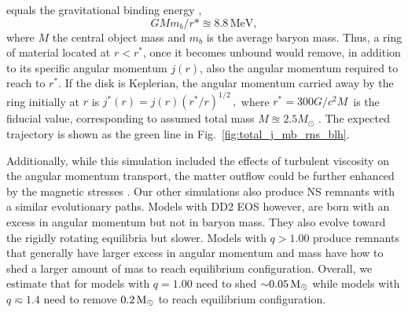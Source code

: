 equals the gravitational binding energy
\citep[\eg][]{Fernandez:2013tya}, 
%
\begin{equation*}
    G M m_b / r* \approxeq 8.8\, \text{MeV}, 
\end{equation*}
%
where $M$ the central object mass and $m_b$ is the average baryon mass.
Thus, a ring of material located at $r < r^*$, once it becomes unbound
would remove, in addition to its specific angular
momentum $j(r)$, also the angular momentum required to reach
to $r^*$. If the disk is Keplerian, the angular momentum carried away by 
the ring initially at $r$ is 
%
    $ j^*(r) = j(r) ( r^* / r )^{1/2}\, ,$
%
where $ r^{*} = 300 G / c^2 M \,$ is the fiducial value, corresponding
to assumed total mass $M \approxeq 2.5M_{\odot}$ \citep{Radice:2018xqa}.
The expected trajectory is shown as the green line in Fig.~\ref{fig:total_j_mb_rns_blh}.

Additionally, while this simulation included the effects of turbulent viscosity on the
angular momentum transport, the matter outflow could be further enhanced by the magnetic stresses 
\citep{Metzger:2006mw,Bucciantini:2011kx,Siegel:2017nub,Fernandez:2018kax,Ciolfi:2020hgg}.
%
%
Our other simulations also produce \ac{NS} remnants with a similar evolutionary paths. 
Models with DD2 \ac{EOS} however, are born with an excess in angular momentum but not in 
baryon mass. They also evolve toward the rigidly rotating equilibria but slower.
Models with $q>1.00$ produce remnants that generally have larger excess in angular momentum 
and mass have how to shed a larger amount of mas to reach equilibrium configuration.
Overall, we estimate that for models with $q=1.00$ need to shed ${\sim}0.05\,{\text{M}_{\odot}}$ while 
models with $q\eqsim 1.4$ need to remove $0.2\,{\text{M}_{\odot}}$ to reach equilibrium configuration.
















